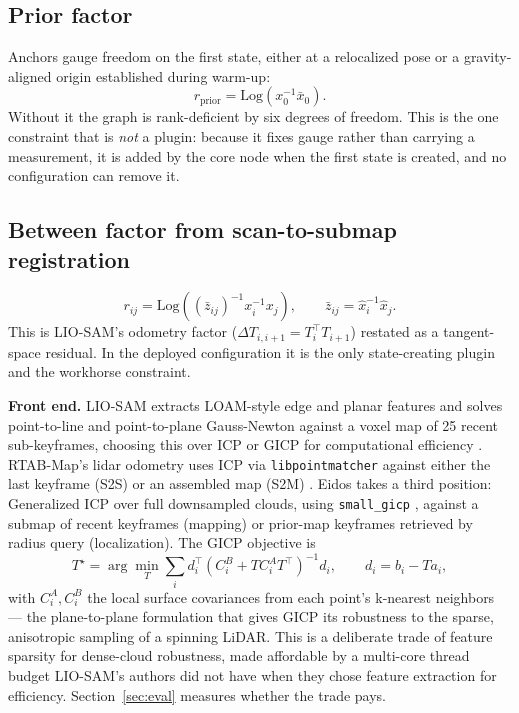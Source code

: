 \documentclass[conference]{IEEEtran}
\begin{document}
\subsection{Prior factor}
Anchors gauge freedom on the first state, either at a relocalized pose or a gravity-aligned origin established during warm-up:
\begin{equation}
r_{\text{prior}} = \mathrm{Log}\!\left(x_0^{-1}\bar{x}_0\right).
\end{equation}
Without it the graph is rank-deficient by six degrees of freedom. This is the one constraint that is \emph{not} a plugin: because it fixes gauge rather than carrying a measurement, it is added by the core node when the first state is created, and no configuration can remove it.

\subsection{Between factor from scan-to-submap registration}
\begin{equation}
r_{ij} = \mathrm{Log}\!\left((\bar{z}_{ij})^{-1}x_i^{-1}x_j\right), \qquad \bar{z}_{ij} = \hat{x}_i^{-1}\hat{x}_j.
\end{equation}
This is LIO-SAM's odometry factor ($\Delta T_{i,i+1} = T_i^\top T_{i+1}$) restated as a tangent-space residual. In the deployed configuration it is the only state-creating plugin and the workhorse constraint.

\textbf{Front end.} LIO-SAM extracts LOAM-style edge and planar features and solves point-to-line and point-to-plane Gauss-Newton against a voxel map of 25 recent sub-keyframes, choosing this over ICP or GICP for computational efficiency \parencite{shan2020liosam}. RTAB-Map's lidar odometry uses ICP via \texttt{libpointmatcher} against either the last keyframe (S2S) or an assembled map (S2M) \parencite{labbe2019rtabmap}. Eidos takes a third position: Generalized ICP over full downsampled clouds, using \texttt{small\_gicp} \parencite{koide2024smallgicp}, against a submap of recent keyframes (mapping) or prior-map keyframes retrieved by radius query (localization). The GICP objective \parencite{segal2009generalized} is
\begin{equation}
T^\star = \arg\min_T \sum_i d_i^\top\!\left(C_i^B + T C_i^A T^\top\right)^{-1} d_i, \qquad d_i = b_i - T a_i,
\end{equation}
with $C_i^A, C_i^B$ the local surface covariances from each point's k-nearest neighbors --- the plane-to-plane formulation that gives GICP its robustness to the sparse, anisotropic sampling of a spinning LiDAR. This is a deliberate trade of feature sparsity for dense-cloud robustness, made affordable by a multi-core thread budget LIO-SAM's authors did not have when they chose feature extraction for efficiency. Section~\ref{sec:eval} measures whether the trade pays.
\end{document}
